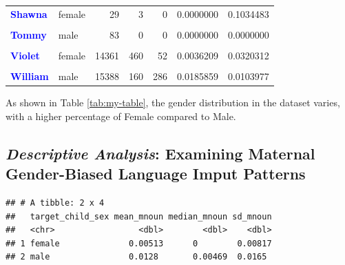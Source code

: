 \documentclass[
  man]{apa6}
\begin{document}
\begin{table}[!h]
\begin{tabular}[t]{>{}llrrrrr}
\textcolor{blue}{\textbf{Shawna}} & female & 29 & 3 & 0 & 0.0000000 & 0.1034483\\
\addlinespace
\textcolor{blue}{\textbf{\cellcolor{gray!10}{Stephen}}} & \cellcolor{gray!10}{male} & \cellcolor{gray!10}{153} & \cellcolor{gray!10}{0} & \cellcolor{gray!10}{2} & \cellcolor{gray!10}{0.0130719} & \cellcolor{gray!10}{0.0000000}\\
\textcolor{blue}{\textbf{Tommy}} & male & 83 & 0 & 0 & 0.0000000 & 0.0000000\\
\textcolor{blue}{\textbf{\cellcolor{gray!10}{Victor}}} & \cellcolor{gray!10}{male} & \cellcolor{gray!10}{504} & \cellcolor{gray!10}{6} & \cellcolor{gray!10}{2} & \cellcolor{gray!10}{0.0039683} & \cellcolor{gray!10}{0.0119048}\\
\textcolor{blue}{\textbf{Violet}} & female & 14361 & 460 & 52 & 0.0036209 & 0.0320312\\
\textcolor{blue}{\textbf{\cellcolor{gray!10}{Wendy}}} & \cellcolor{gray!10}{female} & \cellcolor{gray!10}{195} & \cellcolor{gray!10}{3} & \cellcolor{gray!10}{1} & \cellcolor{gray!10}{0.0051282} & \cellcolor{gray!10}{0.0153846}\\
\addlinespace
\textcolor{blue}{\textbf{William}} & male & 15388 & 160 & 286 & 0.0185859 & 0.0103977\\
\bottomrule
\end{tabular}
\end{table}

As shown in Table \ref{tab:my-table}, the gender distribution in the dataset varies, with a higher percentage of Female compared to Male.

\hypertarget{descriptive-analysis-examining-maternal-gender-biased-language-imput-patterns}{%
\subsection{\texorpdfstring{\emph{Descriptive Analysis}: Examining Maternal Gender-Biased Language Imput Patterns}{Descriptive Analysis: Examining Maternal Gender-Biased Language Imput Patterns}}\label{descriptive-analysis-examining-maternal-gender-biased-language-imput-patterns}}

\begin{verbatim}
## # A tibble: 2 x 4
##   target_child_sex mean_mnoun median_mnoun sd_mnoun
##   <chr>                 <dbl>        <dbl>    <dbl>
## 1 female              0.00513      0        0.00817
## 2 male                0.0128       0.00469  0.0165
\end{verbatim}
\end{document}
